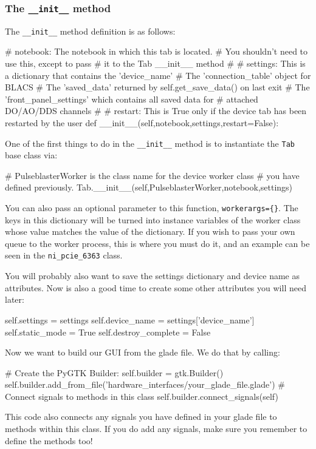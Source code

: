 \documentclass[12pt]{article}
\begin{document}
\subsubsection{The \texttt{\_\_init\_\_} method}\label{device_class_init}
The \texttt{\_\_init\_\_} method definition is as follows:
\begin{python}
    # notebook: The notebook in which this tab is located. 
    #           You shouldn't need to use this, except to pass
    #           it to the Tab __init__ method
    #
    # settings: This is a dictionary that contains the 'device_name'
    #           The 'connection_table' object for BLACS
    #           The 'saved_data' returned by self.get_save_data() on last exit
    #           The 'front_panel_settings' which contains all saved data for
    #           attached DO/AO/DDS channels
    #
    # restart: This is True only if the device tab has been restarted by the user
    def __init__(self,notebook,settings,restart=False):
\end{python}

One of the first things to do in the \texttt{\_\_init\_\_} method is to instantiate the \texttt{Tab} base class via:
\begin{python}
		# PulseblasterWorker is the class name for the device worker class 
		# you have defined previously.
        Tab.__init__(self,PulseblasterWorker,notebook,settings)
\end{python}
You can also pass an optional parameter to this function, \texttt{workerargs=\{\}}. The keys in this dictionary will be turned into instance variables of the worker class whose value matches the value of the dictionary. If you wish to pass your own queue to the worker process, this is where you must do it, and an example can be seen in the \texttt{ni\_pcie\_6363} class.

You will probably also want to save the settings dictionary and device name as attributes. Now is also a good time to create some other attributes you will need later:
\begin{python}
        self.settings = settings
        self.device_name = settings['device_name']
        self.static_mode = True
        self.destroy_complete = False
\end{python}

Now we want to build our GUI from the glade file. We do that by calling:
\begin{python}
        # Create the PyGTK Builder:
        self.builder = gtk.Builder()
        self.builder.add_from_file('hardware_interfaces/your_glade_file.glade')
        # Connect signals to methods in this class
        self.builder.connect_signals(self)
\end{python}
This code also connects any signals you have defined in your glade file to methods within this class. If you do add any signals, make sure you remember to define the methods too!
\end{document}
